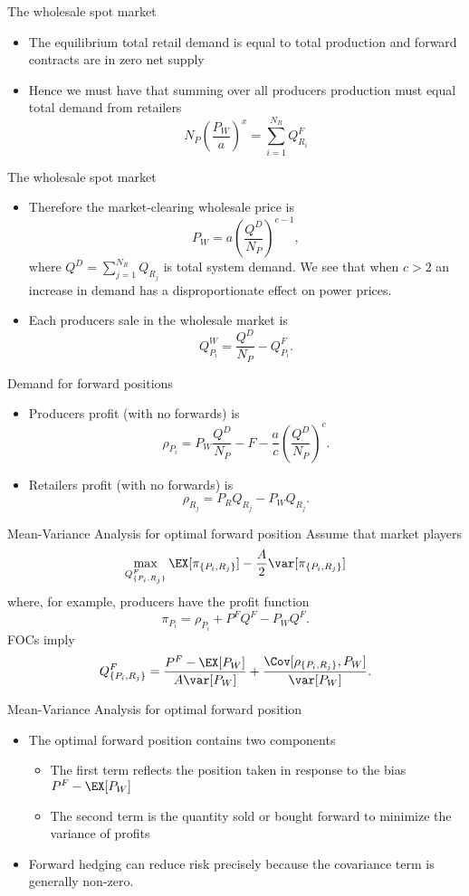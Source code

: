 {The wholesale spot market}
\begin{itemize}
\item<1-> The equilibrium total retail demand is equal to total production and forward contracts are in zero net supply
\item<2-> Hence we must have that summing over all producers production must equal total demand from retailers
$$
N_P\left(\frac{P_W}{a}\right)^{x}=\sum_{i=1}^{N_R}Q_{R_i}^F
$$
\end{itemize}



{The wholesale spot market}
\begin{itemize}
\item<1-> Therefore the market-clearing wholesale price is
$$
P_W=a \left(\frac{Q^D}{N_P}\right)^{c-1},$$
where $Q^D=\sum_{j=1}^{N_R}Q_{R_j}$ is total system demand. We see that when $c>2$ an increase in demand has a disproportionate effect on power prices.
\item<2-> Each producers sale in the wholesale market is
$$
Q_{P_i}^W= \frac{Q^D}{N_P}-Q_{P_i}^F.
$$
\end{itemize}



{Demand for forward positions}
\begin{itemize}
\item<1-> Producers profit (with no forwards) is
$$
\rho_{P_i}=P_W\frac{Q^D}{N_P}-F-\frac{a}{c}\left(\frac{Q^D}{N_P}\right)^{c}.$$
\item<2-> Retailers profit (with no forwards) is
$$
\rho_{R_j}=P_RQ_{R_j}-P_WQ_{R_j}.
$$
\end{itemize}




{Mean-Variance Analysis for optimal forward position}
Assume that market players
$$
\max_{Q^F_{\{P_i,R_j\}}}\EX[\pi_{\{P_i,R_j\}}]-\frac{A}{2}\var[\pi_{\{P_i,R_j\}}]
$$
where, for example, producers have the profit function
$$
\pi_{P_i}=\rho_{P_i}+ P^FQ^F-P_WQ^F.
$$
FOCs imply
$$
Q^F_{\{P_i,R_j\}}= \frac{P^F-\EX[P_W]}{A\var[P_W]}+\frac{\Cov[\rho_{\{P_i,R_j\}},P_W]}{\var[P_W]}.
$$



{Mean-Variance Analysis for optimal forward position}
\begin{itemize}
\item<1-> The optimal forward position contains two components
\begin{itemize}
\item The first term reflects the position taken in response to the bias $P^F-\EX[P_W]$
\item The second term is the quantity sold or bought forward to minimize the variance of profits
\end{itemize}
\item<2-> Forward hedging can reduce risk precisely because the covariance term is generally non-zero.
\end{itemize}





